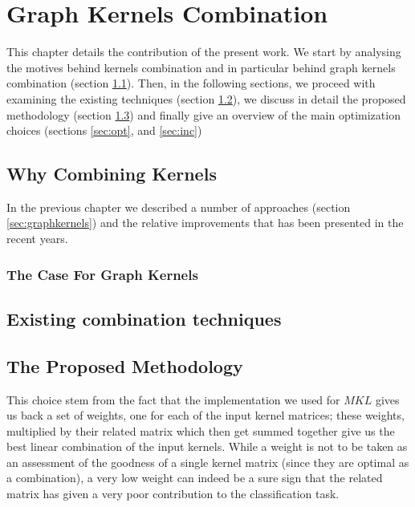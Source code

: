 \chapter{Graph Kernels Combination}
\label{Chapter3}

This chapter details the contribution of the present work.
We start by analysing the motives behind kernels combination and in particular
behind graph kernels combination (section \ref{sec:why}).
Then, in the following sections, we proceed with examining the existing techniques
(section \ref{sec:tech}), we discuss in detail the proposed methodology (section
\ref{sec:meth}) and finally give an overview of the main optimization choices (sections
\ref{sec:opt}, and \ref{sec:inc})

\section{Why Combining Kernels}
\label{sec:why}

In the previous chapter we described a number of approaches (section \ref{sec:graphkernels})
and the relative improvements that has been presented in the recent years.

\subsection{The Case For Graph Kernels}

\section{Existing combination techniques}
\label{sec:tech}

\section{The Proposed Methodology}
\label{sec:meth}
 

This choice stem from the fact that the implementation we used for $MKL$ gives us
back a set of weights, one for each of the input kernel matrices; these weights,
multiplied by their related matrix which then get summed together give us the
best linear combination of the input kernels.
While a weight is not to be taken as an assessment of the goodness of a single
kernel matrix (since they are optimal as a combination), a very low weight can
indeed be a sure sign that the related matrix has given a very poor contribution
to the classification task.

